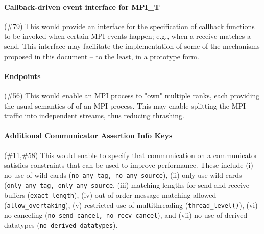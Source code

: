 	\paragraph{Callback-driven event interface for MPI\_T} (\#79) This would 
	provide an interface for the specification of callback functions to be 
	invoked when certain MPI events happen; e.g., when a receive matches a 
	send. This interface may facilitate the implementation of some of the 
	mechanisms proposed in this document -- to the least, in a prototype form.
	
	\paragraph{Endpoints} (\#56) This would enable an MPI process to 
	"own" 
	multiple ranks, each providing the usual semantics of of an MPI process. 
	This may enable splitting the MPI traffic into independent streams, thus 
	reducing thrashing.
	
	\paragraph{Additional Communicator Assertion Info Keys} (\#11,\#58) This 
	would 
	enable to specify that communication on a communicator satisfies 
	constraints that can be used to improve performance. These include (i) no 
	use of wild-cards (\texttt{no\_any\_tag, no\_any\_source}), (ii) only use 
	wild-cards (\texttt{only\_any\_tag, only\_any\_source}, (iii) matching 
	lengths for send and receive 
	buffers (\texttt{exact\_length}), (iv) out-of-order message matching 
	allowed (\texttt{allow\_overtaking}), (v)
	 restricted use of multithreading (\texttt{thread\_level()}), (vi) no 
	canceling (\texttt{no\_send\_cancel, no\_recv\_cancel}), and (vii) no use 
	of derived datatypes (\texttt{no\_derived\_datatypes}).
	